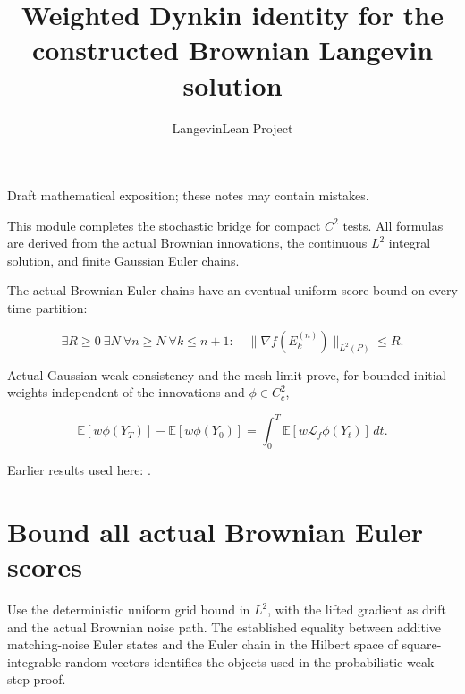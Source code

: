 \documentclass[11pt,a4paper]{article}
\title{\texorpdfstring{Weighted Dynkin identity for the constructed Brownian Langevin solution}{Weighted Dynkin identity for the constructed Brownian Langevin solution}}
\author{LangevinLean Project}
\date{}
\begin{document}
\maketitle
Draft mathematical exposition; these notes may contain mistakes.


This module completes the stochastic bridge for compact \(C^{2}\) tests. All formulas are derived from the actual Brownian innovations, the continuous \(L^{2}\) integral solution, and finite Gaussian Euler chains.



The actual Brownian Euler chains have an eventual uniform score bound on every time partition:


\[\exists R\ge0\ \exists N\ \forall n\ge N\ \forall k\le n+1:
\quad\|\nabla f(E_k^{(n)})\|_{L^2(P)}\le R.\]


Actual Gaussian weak consistency and the mesh limit prove, for bounded initial weights independent of the innovations and \(\phi\in C_c^2\),


\[\mathbb E[w\phi(Y_T)]-\mathbb E[w\phi(Y_0)]
=\int_0^T\mathbb E[w\mathcal L_f\phi(Y_t)]\,dt.\]

Earlier results used here: \cite[Section~3.42]{LangevinLean2026ULASC}.

\section{\texorpdfstring{Bound all actual Brownian Euler scores}{Bound all actual Brownian Euler scores}}


Use the deterministic uniform grid bound in \(L^{2}\), with the lifted gradient as drift and the actual Brownian noise path. The established equality between additive matching-noise Euler states and the Euler chain in the Hilbert space of square-integrable random vectors identifies the objects used in the probabilistic weak-step proof.
\end{document}
